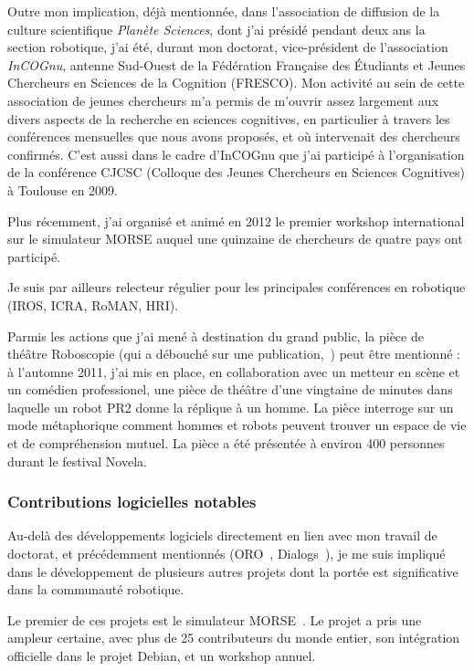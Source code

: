 \documentclass[a4paper]{article}
\begin{document}
Outre mon implication, déjà mentionnée, dans l'association de diffusion de la
culture scientifique \emph{Planète
Sciences}, dont j'ai présidé pendant deux ans la section robotique, j'ai été,
durant mon doctorat, vice-président de l'association \emph{InCOGnu}, antenne
Sud-Ouest de la Fédération Française des Étudiants et Jeunes Chercheurs en
Sciences de la Cognition (FRESCO). Mon activité au sein de cette association de
jeunes chercheurs m'a permis de m'ouvrir assez largement aux divers aspects de
la recherche en sciences cognitives, en particulier à travers les conférences
mensuelles que nous avons proposés, et où intervenait des chercheurs confirmés.
C'est aussi dans le cadre d'InCOGnu que j'ai participé à l'organisation de la
conférence CJCSC (Colloque des Jeunes Chercheurs en Sciences Cognitives) à
Toulouse en 2009.

Plus récemment, j'ai organisé et animé en 2012 le premier workshop international
sur le simulateur MORSE auquel une quinzaine de chercheurs de quatre pays ont
participé.

Je suis par ailleurs relecteur régulier pour les principales conférences en
robotique (IROS, ICRA, RoMAN, HRI).

Parmis les actions que j'ai mené à destination du grand public, la pièce de
théâtre Roboscopie (qui a débouché sur une
publication,~\cite{lemaignan2012roboscopie}) peut être mentionné : à l'automne
2011, j'ai mis en place, en collaboration avec un metteur en scène et un
comédien professionel, une pièce de théâtre d'une vingtaine de minutes dans
laquelle un robot PR2 donne la réplique à un homme. La pièce interroge sur un
mode métaphorique comment hommes et robots peuvent trouver un espace de vie et
de compréhension mutuel. La pièce a été présentée à environ 400 personnes durant
le festival Novela.

\subsubsection{Contributions logicielles notables}

Au-delà des développements logiciels directement en lien avec mon travail de
doctorat, et précédemment mentionnés (ORO~\cite{Lemaignan2010}, {\sc
Dialogs}~\cite{Lemaignan2011a}), je me suis impliqué dans le développement de
plusieurs autres projets dont la portée est significative dans la communauté
robotique.

Le premier de ces projets est le simulateur MORSE~\cite{Echeverria2011,
echeverria2012simulating}. Le projet a pris une ampleur certaine, avec plus de
25 contributeurs du monde entier, son intégration officielle dans le projet
Debian, et un workshop annuel.
\end{document}
